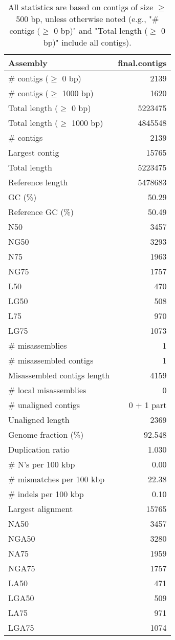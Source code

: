 \documentclass[12pt,a4paper]{article}
\begin{document}
\begin{table}[ht]
\begin{center}
\caption{All statistics are based on contigs of size $\geq$ 500 bp, unless otherwise noted (e.g., "\# contigs ($\geq$ 0 bp)" and "Total length ($\geq$ 0 bp)" include all contigs).}
\begin{tabular}{|l*{1}{|r}|}
\hline
Assembly & final.contigs \\ \hline
\# contigs ($\geq$ 0 bp) & 2139 \\ \hline
\# contigs ($\geq$ 1000 bp) & 1620 \\ \hline
Total length ($\geq$ 0 bp) & 5223475 \\ \hline
Total length ($\geq$ 1000 bp) & 4845548 \\ \hline
\# contigs & 2139 \\ \hline
Largest contig & 15765 \\ \hline
Total length & 5223475 \\ \hline
Reference length & 5478683 \\ \hline
GC (\%) & 50.29 \\ \hline
Reference GC (\%) & 50.49 \\ \hline
N50 & 3457 \\ \hline
NG50 & 3293 \\ \hline
N75 & 1963 \\ \hline
NG75 & 1757 \\ \hline
L50 & 470 \\ \hline
LG50 & 508 \\ \hline
L75 & 970 \\ \hline
LG75 & 1073 \\ \hline
\# misassemblies & 1 \\ \hline
\# misassembled contigs & 1 \\ \hline
Misassembled contigs length & 4159 \\ \hline
\# local misassemblies & 0 \\ \hline
\# unaligned contigs & 0 + 1 part \\ \hline
Unaligned length & 2369 \\ \hline
Genome fraction (\%) & 92.548 \\ \hline
Duplication ratio & 1.030 \\ \hline
\# N's per 100 kbp & 0.00 \\ \hline
\# mismatches per 100 kbp & 22.38 \\ \hline
\# indels per 100 kbp & 0.10 \\ \hline
Largest alignment & 15765 \\ \hline
NA50 & 3457 \\ \hline
NGA50 & 3280 \\ \hline
NA75 & 1959 \\ \hline
NGA75 & 1757 \\ \hline
LA50 & 471 \\ \hline
LGA50 & 509 \\ \hline
LA75 & 971 \\ \hline
LGA75 & 1074 \\ \hline
\end{tabular}
\end{center}
\end{table}
\end{document}

